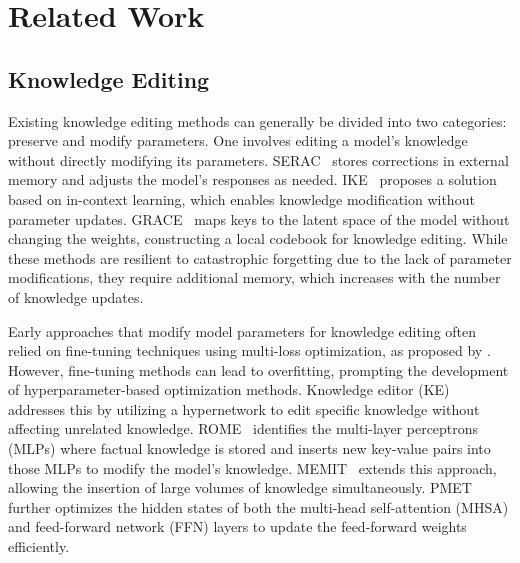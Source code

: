 \section{Related Work}
\subsection{Knowledge Editing}
Existing knowledge editing methods can generally be divided into two categories: preserve and modify parameters.
One involves editing a model's knowledge without directly modifying its parameters. SERAC~\cite{mitchell2022memorybased} stores corrections in external memory and adjusts the model’s responses as needed. 
IKE~\cite{zheng2023edit} proposes a solution based on in-context learning, which enables knowledge modification without parameter updates. GRACE~\cite{hartvigsen2023aging} maps keys to the latent space of the model without changing the weights, constructing a local codebook for knowledge editing. While these methods are resilient to catastrophic forgetting due to the lack of parameter modifications, they require additional memory, which increases with the number of knowledge updates.

Early approaches that modify model parameters for knowledge editing often relied on fine-tuning techniques using multi-loss optimization, as proposed by \citet{sinitsin2020editable}. However, fine-tuning methods can lead to overfitting, prompting the development of hyperparameter-based optimization methods. Knowledge editor (KE)~\cite{decao2021editing} addresses this by utilizing a hypernetwork to edit specific knowledge without affecting unrelated knowledge. ROME~\cite{meng2023locating} identifies the multi-layer perceptrons (MLPs) where factual knowledge is stored and inserts new key-value pairs into those MLPs to modify the model’s knowledge. MEMIT~\cite{meng2023massediting} extends this approach, allowing the insertion of large volumes of knowledge simultaneously. PMET~\cite{li2024pmet} further optimizes the hidden states of both the multi-head self-attention (MHSA) and feed-forward network (FFN) layers to update the feed-forward weights efficiently.

